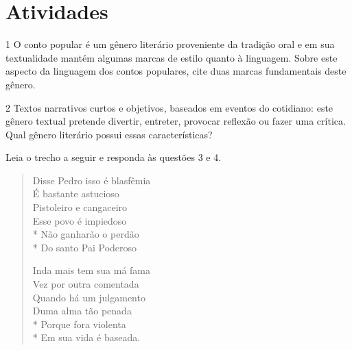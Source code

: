 \section*{Atividades}

\num{1} O conto popular é um gênero literário proveniente da tradição oral e
em sua textualidade mantém algumas marcas de estilo quanto à linguagem. Sobre
este aspecto da linguagem dos contos populares, cite duas marcas fundamentais
deste gênero.


\num{2} Textos narrativos curtos e objetivos, baseados em eventos do
cotidiano: este gênero textual pretende divertir, entreter, provocar
reflexão ou fazer uma crítica. Qual gênero literário possui essas
características?


Leia o trecho a seguir e responda às questões 3 e 4.

\begin{myquote}

\begin{verse}

Disse Pedro isso é blasfêmia \\
É bastante astucioso \\
Pistoleiro e cangaceiro \\ 
Esse povo é impiedoso \\*
Não ganharão o perdão \\*
Do santo Pai Poderoso 

Inda mais tem sua má fama \\
Vez por outra comentada \\
Quando há um julgamento \\
Duma alma tão penada \\*
Porque fora violenta \\*
Em sua vida é baseada. 

\end{verse}


\end{myquote}

